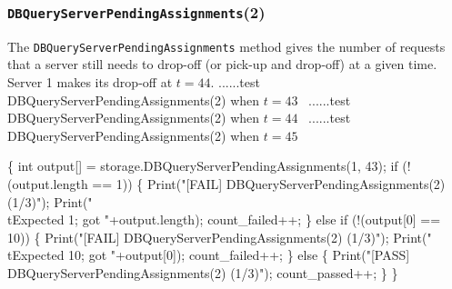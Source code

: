 \documentclass{article}
\def\nwendcode{\endtrivlist \endgroup}
\let\nwdocspar=\par
\begin{document}
\subsubsection{{\tt{}DBQueryServerPendingAssignments}(2)}
The {\tt{}DBQueryServerPendingAssignments} method gives the number of requests that
a server still needs to drop-off (or pick-up and drop-off) at a given time.
Server 1 makes its drop-off at $t=44$.
\nwenddocs{}\endmoddef{}
  \LA{}......test \code{}DBQueryServerPendingAssignments\edoc{}(2) when $t=43$~{\nwtagstyle{}}\RA{}
  \LA{}......test \code{}DBQueryServerPendingAssignments\edoc{}(2) when $t=44$~{\nwtagstyle{}}\RA{}
  \LA{}......test \code{}DBQueryServerPendingAssignments\edoc{}(2) when $t=45$~{\nwtagstyle{}}\RA{}
\nwendcode{}\nwdocspar
\nwenddocs{}\endmoddef{}
\{
  int output[] = storage.DBQueryServerPendingAssignments(1, 43);
  if (!(output.length == 1)) \{
    Print("[FAIL] DBQueryServerPendingAssignments(2) (1/3)");
    Print("\\tExpected 1; got "+output.length);
    count_failed++;
  \} else if (!(output[0] == 10)) \{
    Print("[FAIL] DBQueryServerPendingAssignments(2) (1/3)");
    Print("\\tExpected 10; got "+output[0]);
    count_failed++;
  \} else \{
    Print("[PASS] DBQueryServerPendingAssignments(2) (1/3)");
    count_passed++;
  \}
\}
\nwendcode{}\nwdocspar
\nwenddocs{}\endmoddef{}
\end{document}

